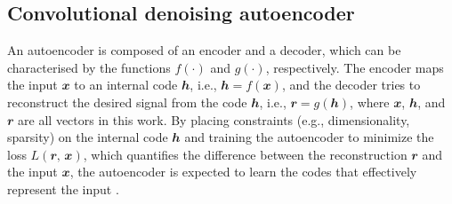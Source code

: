 \documentclass[fleqn,usenatbib]{mnras}
\newcommand{\B}[1]{\mathbfit{#1}}
\begin{document}
\subsection{Convolutional denoising autoencoder}
\label{sec:cdae}

An autoencoder is composed of an encoder and a decoder, which can be
characterised by the functions $f(\cdot)$ and $g(\cdot)$, respectively.
The encoder maps the input $\B{x}$ to an internal code $\B{h}$, i.e.,
$\B{h} = f(\B{x})$, and the decoder tries to reconstruct the desired
signal from the code $\B{h}$, i.e., $\B{r} = g(\B{h})$, where $\B{x}$,
$\B{h}$, and $\B{r}$ are all vectors in this work.
By placing constraints (e.g., dimensionality, sparsity) on the
internal code $\B{h}$ and training the autoencoder to minimize the
loss $L(\B{r}, \,\B{x})$, which quantifies the difference between the
reconstruction $\B{r}$ and the input $\B{x}$, the autoencoder is expected
to learn the codes that effectively represent the input
\citep[chapter 14]{goodfellow2016}.
\end{document}
